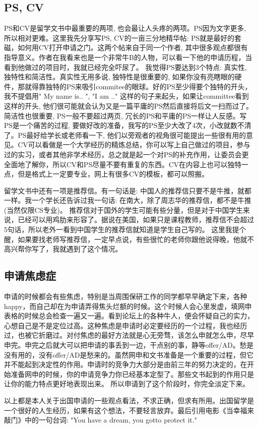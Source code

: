 \subsection{PS, CV}

PS和CV是留学文书中最重要的两项, 也会最让人头疼的两项。PS因为文字更多, 所以相对更难。这里我先分享写PS, CV的一亩三分地精华帖: PS就是最好的套磁，如何用CV打开申请之门。这两个帖来自于同一个作者, 其中很多观点都很有指导意义。作者在我看来也是一个非常牛B的人物，可以看一下他的申请历程，当看到他做过的项目时，我就已经完全吓尿了。 我觉得PS要达到3个特点: 真实性, 独特性和简洁性。真实性无用多说, 独特性是很重要的, 如果你没有亮瞎眼的硬件，那就得靠独特的PS来吸引commitee的眼球。好的PS至少得要个独特的开头，我不提倡用" My name is.. ", "I am .." 这样的句子来起头，如果让committee看到这样的开头, 他们很可能就会认为又是一篇平庸的PS然后直接将后文一扫而过了。简洁性也很重要, PS一般不要超过两页, 冗长的PS和平庸的PS一样让人反感。写PS是一个痛苦的过程, 要做好改的准备，我写的PS至少大改了4次，小改就数不清了。PS最好给学长或老师看一下, 他们以旁观者的视角很可能提出一些很有用的意见。CV可以看做是一个大学经历的精炼总结，你可以写上自己做过的项目，参与过的实习，或者其他非学术经历，总之就是起一个对PS的补充作用，让委员会更全面地了解你，所以CV和PS尽量不要有重复的东西。CV在内容上也可以独特一点，但是格式上一定要专业，网上有很多CV的模板，都可以照搬。\par

留学文书中还有一项是推荐信。有一句话是: 中国人的推荐信只要不是牛推，就都一样。我一个学长还告诉过我一句话: 在南大，除了周志华的推荐信，都不是牛推(当然仅限CS专业)。 推荐信对于国外的学生可能有些分量，但是对于中国学生来说，已经可以用鸡肋来形容了。据说在美国，如果只是课程教师，推荐信不会超过5句话，所以老外一看到中国学生的推荐信就知道是学生自己写的。 这里我提个醒，如果要找老师写推荐信，一定早点说，有些很忙的老师你跟他说得晚，他就不高兴帮你写了，我就遇到了这个情况。
\subsection{申请焦虑症}

申请的时候都会有些焦虑，特别是当周围保研工作的同学都早早确定下来，各种happy，而自己却在为申请弄得焦头烂额的时候。这个时候人会心里发虚，填网申表格的时候总会检查一遍又一遍。看到论坛上的各种牛人，便会怀疑自己的实力，心想自己是不是定位过高。这种焦虑是申请时必定要经历的一个过程，我也经历过，也被它折磨过。对付焦虑的最好方法就是心无旁骛，该怎么申就怎么申，尽早申完。申完之后就大可以把申请的事丢到一边，干点别的事，静等offer/AD。愁是没有用的，没有offer/AD是愁来的。虽然网申和文书准备是一个重要的过程，但它并不能起到决定性的作用。申请时的竞争力大部分是由前三年的努力决定的，在开始准备网申的时候，你的申请竞争力你已经基本定型了。那些文书起到的作用只是让你的能力特点更好地表现出来。 所以申请到了这个阶段时，你完全淡定下来。\par

 以上都是本人关于出国申请的一些观点看法，不求正确，但求有所用。出国留学是一个很好的人生经历，如果有这个想法，不要轻言放弃。最后引用电影《当幸福来敲门》中的一句台词: "You have a dream, you gotto protect it."    